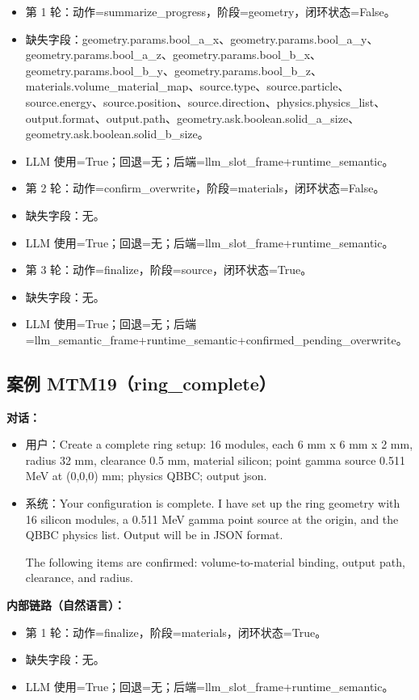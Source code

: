 \documentclass[11pt]{ctexart}
\begin{document}
\begin{itemize}
\item 第 1 轮：动作=summarize\_progress，阶段=geometry，闭环状态=False。
\item 缺失字段：geometry.params.bool\_a\_x、geometry.params.bool\_a\_y、geometry.params.bool\_a\_z、geometry.params.bool\_b\_x、geometry.params.bool\_b\_y、geometry.params.bool\_b\_z、materials.volume\_material\_map、source.type、source.particle、source.energy、source.position、source.direction、physics.physics\_list、output.format、output.path、geometry.ask.boolean.solid\_a\_size、geometry.ask.boolean.solid\_b\_size。
\item LLM 使用=True；回退=无；后端=llm\_slot\_frame+runtime\_semantic。
\item 第 2 轮：动作=confirm\_overwrite，阶段=materials，闭环状态=False。
\item 缺失字段：无。
\item LLM 使用=True；回退=无；后端=llm\_slot\_frame+runtime\_semantic。
\item 第 3 轮：动作=finalize，阶段=source，闭环状态=True。
\item 缺失字段：无。
\item LLM 使用=True；回退=无；后端=llm\_semantic\_frame+runtime\_semantic+confirmed\_pending\_overwrite。
\end{itemize}
\subsection{案例 MTM19（ring\_complete）}
\textbf{对话：}
\begin{itemize}
\item 用户：Create a complete ring setup: 16 modules, each 6 mm x 6 mm x 2 mm, radius 32 mm, clearance 0.5 mm, material silicon; point gamma source 0.511 MeV at (0,0,0) mm; physics QBBC; output json.
\item 系统：Your configuration is complete. I have set up the ring geometry with 16 silicon modules, a 0.511 MeV gamma point source at the origin, and the QBBC physics list. Output will be in JSON format.

The following items are confirmed: volume-to-material binding, output path, clearance, and radius.
\end{itemize}
\textbf{内部链路（自然语言）：}
\begin{itemize}
\item 第 1 轮：动作=finalize，阶段=materials，闭环状态=True。
\item 缺失字段：无。
\item LLM 使用=True；回退=无；后端=llm\_slot\_frame+runtime\_semantic。
\end{itemize}
\end{document}

